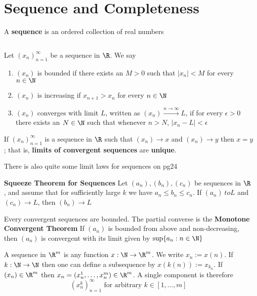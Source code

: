 \documentclass[11pt]{article}
\begin{document}
\section*{Sequence and Completeness}

A \textbf{sequence} is an ordered collection of real numbers

$ $\\
\begin{defn*}
  Let $(x_n)_{n=1}^{\infty}$ be a sequence in $\R$. We say
  \begin{enumerate}
    \item $(x_n)$ is bounded if there exists an $M>0$ such that $|x_n| < M$ for every $n\in \N$
    \item $(x_n)$ is increasing if $x_{n+1} > x_n$ for every $n\in \N$
    \item $(x_n)$ converges with limit $L$, written as $(x_n)\xrightarrow{n\to \infty}L$, if for every $\epsilon > 0$ there exists an $N\in\N$ such that whenever $n>N$, $|x_n - L| < \epsilon$
  \end{enumerate}
\end{defn*}

\begin{proposition*}
  If $(x_n)_{n=1}^{\infty}$ is a sequence in $\R$ such that $(x_n)\to x$ and $(x_n)\to y$ then $x=y$; that is, \textbf{limits of convergent sequences} are \textbf{unique}.
  \begin{rem}
    There is also quite some limit laws for sequences on pg24
  \end{rem}
\end{proposition*}


\begin{theorem*}
  \textbf{Squeeze Theorem for Sequences}
  Let $(a_n), (b_n), (c_n)$ be sequences in $\R$, and assume that for sufficiently large $k$ we have $a_n \leq b_n \leq c_n$. If $(a_n)\ to L$ and $(c_n)\to L$, then $(b_n)\to L$
\end{theorem*}

\begin{theorem*}
  Every convergent sequences are bounded. The partial converse is the \textbf{Monotone Convergent Theorem} If $(a_n)$ is bounded from above and non-decreasing, then $(a_n)$ is convergent with its limit given by $\sup \{ a_n: n\in\N \}$
\end{theorem*}


$ $\\A sequence in $\R^m$ is any function $x: \N \to \R^m$. We write $x_n := x(n)$. If $k: \N \to \N$ then one can define a subsequence by $x(k(n)) := x_{k_n}$. If $(x_n)\in\R^m$ then $x_n = (x_n^1, \dots, x_n^m)\in \R^m$. A single component is therefore
\[
  (x_n^k)_{n=1}^{\infty} \text{ for arbitrary } k\in [1,\dots, m]
\]
\end{document}
